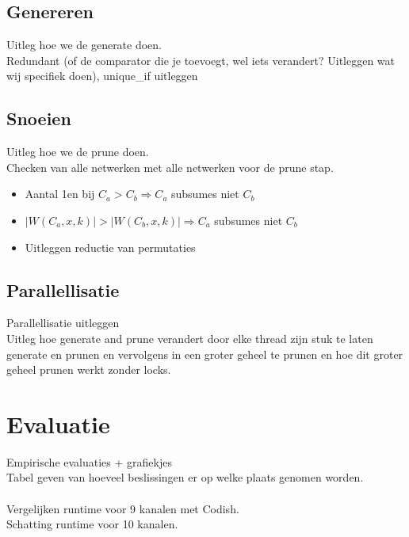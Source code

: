 \documentclass{article}
\begin{document}
\subsection{Genereren}
Uitleg hoe we de generate doen.\\
Redundant (of de comparator die je toevoegt, wel iets verandert? Uitleggen wat wij specifiek doen), unique\_if uitleggen

\subsection{Snoeien}
Uitleg hoe we de prune doen.\\
Checken  van alle netwerken met alle netwerken voor de prune stap.
\begin{itemize}
\item Aantal 1en bij $C_a > C_b \Rightarrow C_a$ subsumes niet $C_b$ 
\item $|W(C_a, x, k)| > |W(C_b, x, k)| \Rightarrow C_a$ subsumes niet $C_b$
\item Uitleggen reductie van permutaties
\end{itemize}

\subsection{Parallellisatie}
Parallellisatie uitleggen\\
Uitleg hoe generate and prune verandert door elke thread zijn stuk te laten generate en prunen en vervolgens in een groter geheel te prunen en hoe dit groter geheel prunen werkt zonder locks.


\section{Evaluatie}
Empirische evaluaties + grafiekjes\\
Tabel geven van hoeveel beslissingen er op welke plaats genomen worden.\\ \\
Vergelijken runtime voor 9 kanalen met Codish.\\
Schatting runtime voor 10 kanalen.\\\\
\end{document}
